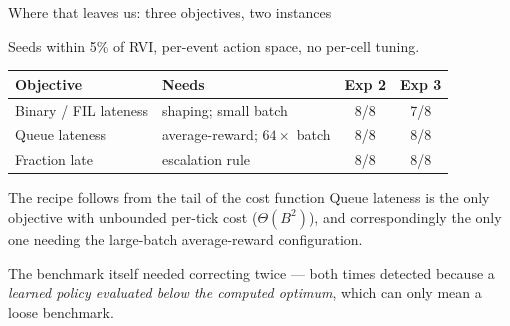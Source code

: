 \documentclass[11pt,aspectratio=169]{beamer}
\begin{document}
\begin{frame}{Where that leaves us: three objectives, two instances}

Seeds within 5\% of RVI, per-event action space, no per-cell tuning.

\begin{center}
\begin{tabular}{p{3.2cm}p{4.2cm}cc}
\toprule
\textbf{Objective} & \textbf{Needs} & \textbf{Exp 2} & \textbf{Exp 3} \\
\midrule
Binary / FIL lateness   & shaping; small batch      & 8/8 & 7/8 \\
Queue lateness          & average-reward; $64\times$ batch & 8/8 & 8/8 \\
Fraction late           & escalation rule           & 8/8 & 8/8 \\
\bottomrule
\end{tabular}
\end{center}

\vfill
\begin{block}{The recipe follows from the tail of the cost function}
Queue lateness is the only objective with unbounded per-tick cost
($\Theta(B^2)$), and correspondingly the only one needing the large-batch
average-reward configuration.
\end{block}

\vfill
\small
The benchmark itself needed correcting twice --- both times detected because a
\emph{learned policy evaluated below the computed optimum}, which can only mean
a loose benchmark.

\end{frame}
\end{document}
